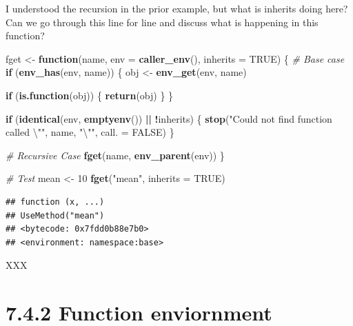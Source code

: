 \documentclass[]{book}
\newenvironment{Shaded}{\begin{snugshade}}{\end{snugshade}}
\newcommand{\CharTok}[1]{\textcolor[rgb]{0.31,0.60,0.02}{#1}}
\newcommand{\CommentTok}[1]{\textcolor[rgb]{0.56,0.35,0.01}{\textit{#1}}}
\newcommand{\ControlFlowTok}[1]{\textcolor[rgb]{0.13,0.29,0.53}{\textbf{#1}}}
\newcommand{\DataTypeTok}[1]{\textcolor[rgb]{0.13,0.29,0.53}{#1}}
\newcommand{\DecValTok}[1]{\textcolor[rgb]{0.00,0.00,0.81}{#1}}
\newcommand{\KeywordTok}[1]{\textcolor[rgb]{0.13,0.29,0.53}{\textbf{#1}}}
\newcommand{\NormalTok}[1]{#1}
\newcommand{\OperatorTok}[1]{\textcolor[rgb]{0.81,0.36,0.00}{\textbf{#1}}}
\newcommand{\OtherTok}[1]{\textcolor[rgb]{0.56,0.35,0.01}{#1}}
\newcommand{\StringTok}[1]{\textcolor[rgb]{0.31,0.60,0.02}{#1}}
\begin{document}
I understood the recursion in the prior example, but what is inherits doing here? Can we go through this line for line and discuss what is happening in this function?

\begin{Shaded}
\begin{Highlighting}[]
\NormalTok{fget <-}\StringTok{ }\ControlFlowTok{function}\NormalTok{(name, }\DataTypeTok{env =} \KeywordTok{caller_env}\NormalTok{(), }\DataTypeTok{inherits =} \OtherTok{TRUE}\NormalTok{) \{}
  \CommentTok{# Base case}
  \ControlFlowTok{if}\NormalTok{ (}\KeywordTok{env_has}\NormalTok{(env, name)) \{}
\NormalTok{    obj <-}\StringTok{ }\KeywordTok{env_get}\NormalTok{(env, name)}

    \ControlFlowTok{if}\NormalTok{ (}\KeywordTok{is.function}\NormalTok{(obj)) \{}
      \KeywordTok{return}\NormalTok{(obj)}
\NormalTok{    \}}
\NormalTok{  \}}

  \ControlFlowTok{if}\NormalTok{ (}\KeywordTok{identical}\NormalTok{(env, }\KeywordTok{emptyenv}\NormalTok{()) }\OperatorTok{||}\StringTok{ }\OperatorTok{!}\NormalTok{inherits) \{}
    \KeywordTok{stop}\NormalTok{(}\StringTok{"Could not find function called }\CharTok{\textbackslash{}"}\StringTok{"}\NormalTok{, name, }\StringTok{"}\CharTok{\textbackslash{}"}\StringTok{"}\NormalTok{, }\DataTypeTok{call. =} \OtherTok{FALSE}\NormalTok{)}
\NormalTok{  \}}

  \CommentTok{# Recursive Case}
  \KeywordTok{fget}\NormalTok{(name, }\KeywordTok{env_parent}\NormalTok{(env))}
\NormalTok{\}}
\end{Highlighting}
\end{Shaded}

\begin{Shaded}
\begin{Highlighting}[]
\CommentTok{# Test}
\NormalTok{mean <-}\StringTok{ }\DecValTok{10}
\KeywordTok{fget}\NormalTok{(}\StringTok{"mean"}\NormalTok{, }\DataTypeTok{inherits =} \OtherTok{TRUE}\NormalTok{)}
\end{Highlighting}
\end{Shaded}

\begin{verbatim}
## function (x, ...) 
## UseMethod("mean")
## <bytecode: 0x7fdd0b88e7b0>
## <environment: namespace:base>
\end{verbatim}

XXX

\hypertarget{function-enviornment}{%
\section*{7.4.2 Function enviornment}\label{function-enviornment}}
\end{document}
